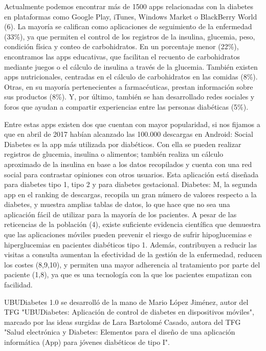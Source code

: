 
Actualmente podemos encontrar más de 1500 apps relacionadas con la diabetes en plataformas como Google Play, iTunes, Windows Market o BlackBerry World (6). La mayoría se califican como aplicaciones de seguimiento de la enfermedad (33\%), ya que permiten el control de los registros de la insulina, glucemia, peso, condición física y conteo de carbohidratos. En un porcentaje menor (22\%), encontramos las apps educativas, que facilitan el recuento de carbohidratos mediante juegos o el cálculo de insulina a través de la glucemia. También existen apps nutricionales, centradas en el cálculo de carbohidratos en las comidas (8\%). Otras, en su mayoría pertenecientes a farmacéuticas, prestan información sobre sus productos (8\%). Y, por último, también se han desarrollado redes sociales y foros que ayudan a compartir experiencias entre las personas diabéticas (5\%).

Entre estas apps existen dos que cuentan con mayor popularidad, si nos fijamos a que en abril de 2017 habían alcanzado las 100.000 descargas en Android: Social Diabetes es la app más utilizada por diabéticos. Con ella se pueden realizar registros de glucemia, insulina o alimentos; también realiza un cálculo aproximado de la insulina en base a los datos recopilados y cuenta con una red social para contrastar opiniones con otros usuarios. Esta aplicación está diseñada para diabetes tipo 1, tipo 2 y para diabetes gestacional. Diabetes: M, la segunda app en el ranking de descargas, recopila un gran número de valores respecto a la diabetes, y muestra amplias tablas de datos, lo que hace que no sea una aplicación fácil de utilizar para la mayoría de los pacientes.
A pesar de las reticencias de la población (4), existe suficiente evidencia científica que demuestra que las aplicaciones móviles pueden prevenir el riesgo de sufrir hipoglucemias e hiperglucemias en pacientes diabéticos tipo 1. Además, contribuyen a reducir las visitas a consulta aumentan la efectividad de la gestión de la enfermedad, reducen los costes (8,9,10), y permiten una mayor adherencia al tratamiento por parte del paciente (1,8), ya que es una tecnología con la que los pacientes empatizan con facilidad\cite{bruno2017}.

UBUDiabetes 1.0 se desarrolló de la mano de Mario López Jiménez, autor del TFG "UBUDiabetes: Aplicación de control de
diabetes en dispositivos móviles", marcado por las ideas surgidas de Lara Bartolomé Casado, autora del TFG "Salud electrónica y Diabetes: Elementos para el diseño de una aplicación informática (App) para jóvenes diabéticos de tipo I".

